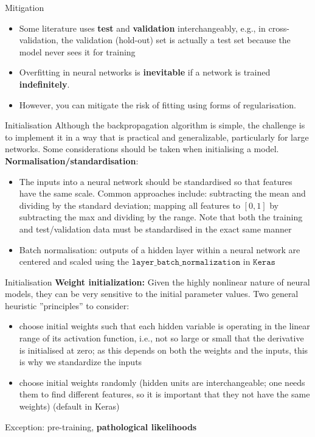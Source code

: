 \documentclass{beamer}
\begin{document}
\begin{frame}{Mitigation}
\begin{itemize}
\item Some literature uses \textbf{test} and \textbf{validation} interchangeably, e.g., in cross-validation, the validation (hold-out) set is actually a test set because the model never sees it for training
\item Overfitting in neural networks is \textbf{inevitable} if a network is trained \textbf{indefinitely}. 
\item However, you can mitigate the risk of fitting using forms of regularisation. 
\end{itemize}
\end{frame}
\begin{frame}{Initialisation}
Although the backpropagation algorithm is simple, the challenge is to implement it in a way that is practical and generalizable, particularly for large networks. Some considerations should be taken when initialising a model.\\

\textbf{Normalisation/standardisation}: 
\begin{itemize}
\item The inputs into a neural network should be standardised so that features have the same scale. Common approaches include: subtracting the mean and dividing by the standard deviation; mapping all features to $[0,1]$ by subtracting the max and dividing by the range. Note that both the training and test/validation data must be standardised in the exact same manner
\item Batch normalisation: outputs of a hidden layer within a neural network are centered and scaled using the $\texttt{layer\_batch\_normalization}$ in $\texttt{Keras}$
\end{itemize}
\end{frame}
\begin{frame}{Initialisation}
\textbf{Weight initialization:}
Given the highly nonlinear nature of neural models, they can be very sensitive to the initial parameter values. Two general heuristic ''principles'' to consider:
\begin{itemize}
\item choose initial weights such that each hidden variable is operating in the linear range of its activation function, i.e., not so large or small that the derivative is initialised at zero; as this depends on both the weights and the inputs, this is why we standardize the inputs
\item choose initial weights randomly (hidden units are interchangeable; one needs them to find different features, so it is important that they not have the same weights) (default in Keras)
\end{itemize}
Exception: pre-training, \textbf{pathological likelihoods}
\end{frame}
\end{document}
